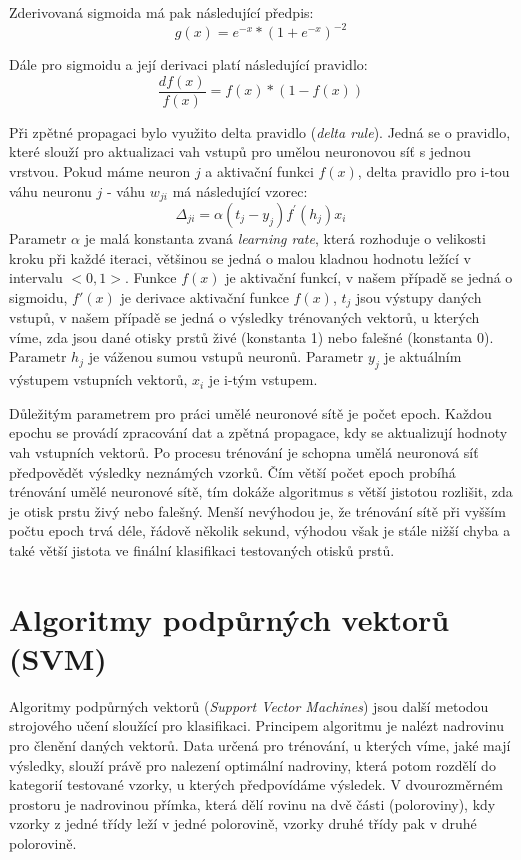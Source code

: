 Zderivovaná sigmoida má pak následující předpis:
$$g(x)=e^{-x}*{(1+e^{-x})}^{-2}$$

Dále pro sigmoidu a její derivaci platí následující pravidlo:
$$\frac{df(x)}{f(x)} = f(x)*(1-f(x))$$

Při zpětné propagaci bylo využito delta pravidlo (\textit{delta rule}). Jedná se o pravidlo, které slouží pro aktualizaci vah vstupů pro umělou neuronovou síť s jednou vrstvou. Pokud máme neuron $j$ a aktivační funkci $f(x)$, delta pravidlo pro i-tou váhu neuronu $j$ - váhu $w_{ji}$ má následující vzorec:
$$\Delta_{ji} = \alpha(t_j - y_j)f^{'}(h_j)x_i$$
Parametr $\alpha$ je malá konstanta zvaná \textit{learning rate}, která rozhoduje o velikosti kroku při každé iteraci, většinou se jedná o malou kladnou hodnotu ležící v intervalu $<0,1>$. \cite{LearningRate} Funkce $f(x)$ je aktivační funkcí, v našem případě se jedná o sigmoidu, $f'(x)$ je derivace aktivační funkce $f(x)$, $t_j$ jsou výstupy daných vstupů, v našem případě se jedná o výsledky trénovaných vektorů, u kterých víme, zda jsou dané otisky prstů živé (konstanta 1) nebo falešné (konstanta 0). Parametr $h_j$ je váženou sumou vstupů neuronů. Parametr $y_j$ je aktuálním výstupem vstupních vektorů, $x_i$ je i-tým vstupem. \cite{DeltaRule}

Důležitým parametrem pro práci umělé neuronové sítě je počet epoch. Každou epochu se provádí zpracování dat a zpětná propagace, kdy se aktualizují hodnoty vah vstupních vektorů. Po procesu trénování je schopna umělá neuronová síť předpovědět výsledky neznámých vzorků. Čím větší počet epoch probíhá trénování umělé neuronové sítě, tím dokáže algoritmus s větší jistotou rozlišit, zda je otisk prstu živý nebo falešný. Menší nevýhodou je, že trénování sítě při vyšším počtu epoch trvá déle, řádově několik sekund, výhodou však je stále nižší chyba a také větší jistota ve finální klasifikaci testovaných otisků prstů.


\section{Algoritmy podpůrných vektorů (SVM)}
Algoritmy podpůrných vektorů (\textit{Support Vector Machines}) jsou další metodou strojového učení sloužící pro klasifikaci. Principem algoritmu je nalézt nadrovinu pro členění daných vektorů. Data určená pro trénování, u kterých víme, jaké mají výsledky, slouží právě pro nalezení optimální nadroviny, která potom rozdělí do kategorií testované vzorky, u kterých předpovídáme výsledek. V dvourozměrném prostoru je nadrovinou přímka, která dělí rovinu na dvě části (poloroviny), kdy vzorky z jedné třídy leží v jedné polorovině, vzorky druhé třídy pak v druhé polorovině. 

